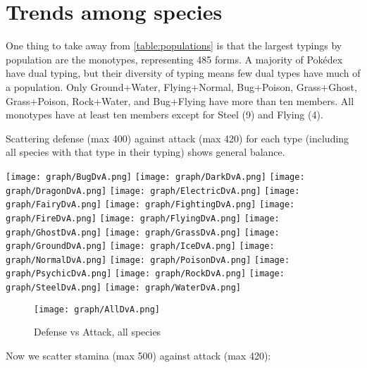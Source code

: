 \section{Trends among species}
One thing to take away from \autoref{table:populations} is that the largest
  typings by population are the monotypes, representing 485 forms.
A majority of Pokédex have dual typing, but their diversity of typing means few dual types have much of a population.
Only Ground+Water, Flying+Normal, Bug+Poison, Grass+Ghost, Grass+Poison, Rock+Water, and Bug+Flying
  have more than ten members.
All monotypes have at least ten members except for Steel (9) and Flying (4).

Scattering defense (max 400) against attack (max 420) for each type
  (including all species with that type in their typing) shows general
  balance.

\noindent{}\texttt{[image: graph/BugDvA.png]}
\texttt{[image: graph/DarkDvA.png]}
\texttt{[image: graph/DragonDvA.png]}
\texttt{[image: graph/ElectricDvA.png]}
\texttt{[image: graph/FairyDvA.png]}
\texttt{[image: graph/FightingDvA.png]}
\texttt{[image: graph/FireDvA.png]}
\texttt{[image: graph/FlyingDvA.png]}
\texttt{[image: graph/GhostDvA.png]}
\texttt{[image: graph/GrassDvA.png]}
\texttt{[image: graph/GroundDvA.png]}
\texttt{[image: graph/IceDvA.png]}
\texttt{[image: graph/NormalDvA.png]}
\texttt{[image: graph/PoisonDvA.png]}
\texttt{[image: graph/PsychicDvA.png]}
\texttt{[image: graph/RockDvA.png]}
\texttt{[image: graph/SteelDvA.png]}
\texttt{[image: graph/WaterDvA.png]}
\begin{figure}[h]
\centering
\texttt{[image: graph/AllDvA.png]}
  \caption{Defense vs Attack, all species\label{figure:alldva}}
\end{figure}

Now we scatter stamina (max 500) against attack (max 420):

